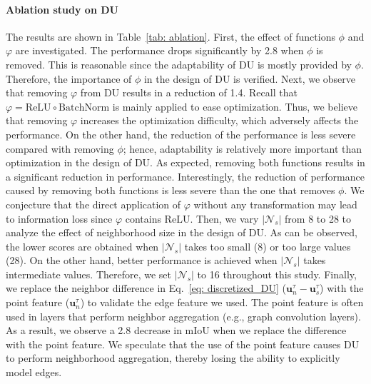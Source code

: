 \documentclass[a4paper,fleqn]{cas-dc}
\begin{document}
\paragraph{Ablation study on DU} The results are shown in Table~\ref{tab: ablation}. First, the effect of functions $\phi$ and $\varphi$ are investigated. 
The performance drops significantly by 2.8 when $\phi$ is removed. This is reasonable since the adaptability of DU is mostly provided by $\phi$. Therefore, the importance of $\phi$ in the design of DU is verified. 
Next, we observe that removing $\varphi$ from DU results in a reduction of 1.4. Recall that $\varphi=\mathrm{ReLU}\circ\mathrm{BatchNorm}$ is mainly applied to ease optimization. Thus, we believe that removing $\varphi$ increases the optimization difficulty, which adversely affects the performance. On the other hand, the reduction of the performance is less severe compared with removing $\phi$; hence, adaptability is relatively more important than optimization in the design of DU. 
As expected, removing both functions results in a significant reduction in performance. Interestingly, the reduction of performance caused by removing both functions is less severe than the one that removes $\phi$. We conjecture that the direct application of $\varphi$ without any transformation may lead to information loss since $\varphi$ contains $\mathrm{ReLU}$.        
Then, we vary $|\mathcal{N}_s|$ from 8 to 28 to analyze the effect of neighborhood size in the design of DU. As can be observed, the lower scores are obtained when $|\mathcal{N}_s|$ takes too small (8) or too large values (28). On the other hand, better performance is achieved when $|\mathcal{N}_s|$ takes intermediate values. Therefore, we set $|\mathcal{N}_s|$ to 16 throughout this study.   
Finally, we replace the neighbor difference in Eq.~\eqref{eq: discretized_DU} ($\textbf{u}_n^\tau - \textbf{u}_s^\tau$) with the point feature ($\textbf{u}_n^\tau$) to validate the edge feature we used. The point feature is often used in layers that perform neighbor aggregation (e.g., graph convolution layers). As a result, we observe a 2.8 decrease in mIoU when we replace the difference with the point feature. We speculate that the use of the point feature causes DU to perform neighborhood aggregation, thereby losing the ability to explicitly model edges.
\end{document}
